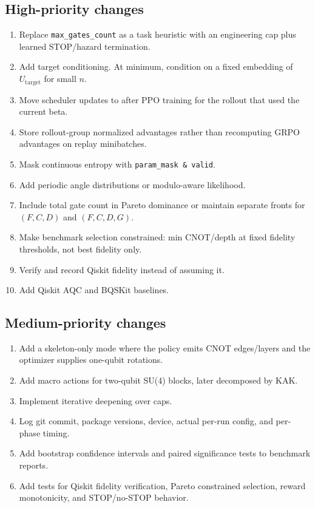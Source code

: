 \documentclass[11pt,a4paper]{article}
\newcommand{\Utarget}{U_{\mathrm{target}}}
\begin{document}
\subsection{High-priority changes}

\begin{enumerate}[leftmargin=2em]
  \item Replace \texttt{max\_gates\_count} as a task heuristic with an
        engineering cap plus learned STOP/hazard termination.
  \item Add target conditioning. At minimum, condition on a fixed embedding of
        $\Utarget$ for small $n$.
  \item Move scheduler updates to after PPO training for the rollout that used
        the current beta.
  \item Store rollout-group normalized advantages rather than recomputing GRPO
        advantages on replay minibatches.
  \item Mask continuous entropy with \texttt{param\_mask \& valid}.
  \item Add periodic angle distributions or modulo-aware likelihood.
  \item Include total gate count in Pareto dominance or maintain separate
        fronts for $(F,C,D)$ and $(F,C,D,G)$.
  \item Make benchmark selection constrained: min CNOT/depth at fixed fidelity
        thresholds, not best fidelity only.
  \item Verify and record Qiskit fidelity instead of assuming it.
  \item Add Qiskit AQC and BQSKit baselines.
\end{enumerate}

\subsection{Medium-priority changes}

\begin{enumerate}[leftmargin=2em]
  \item Add a skeleton-only mode where the policy emits CNOT edges/layers and
        the optimizer supplies one-qubit rotations.
  \item Add macro actions for two-qubit SU(4) blocks, later decomposed by KAK.
  \item Implement iterative deepening over caps.
  \item Log git commit, package versions, device, actual per-run config, and
        per-phase timing.
  \item Add bootstrap confidence intervals and paired significance tests to
        benchmark reports.
  \item Add tests for Qiskit fidelity verification, Pareto constrained
        selection, reward monotonicity, and STOP/no-STOP behavior.
\end{enumerate}
\end{document}
